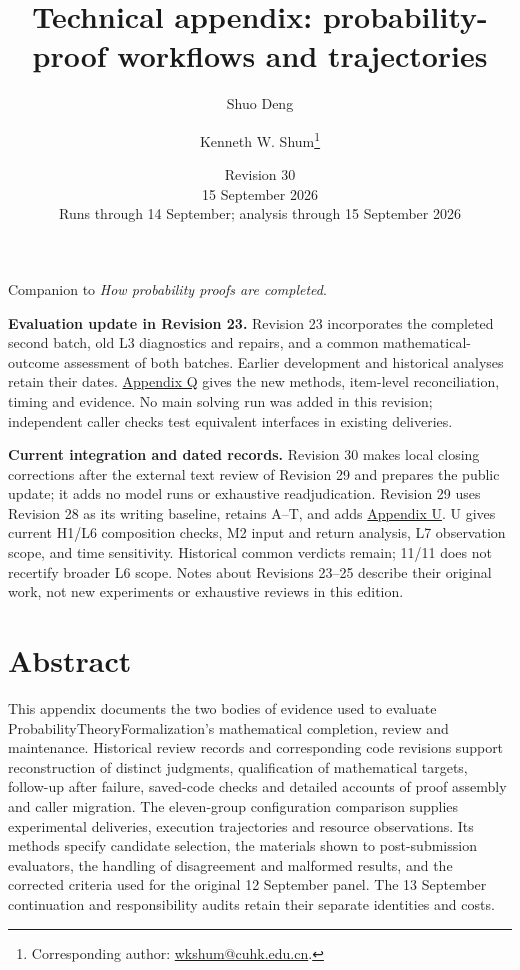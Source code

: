 
\title{Technical appendix: probability-proof workflows and trajectories}
\author{Shuo Deng \and Kenneth W. Shum\thanks{Corresponding author: \href{mailto:wkshum@cuhk.edu.cn}{wkshum@cuhk.edu.cn}.}}\date{Revision 30\\15 September 2026\\Runs through 14 September; analysis through 15 September 2026}
\maketitle
Companion to \emph{How probability proofs are completed}.

\textbf{Evaluation update in Revision 23.} Revision 23 incorporates the completed second batch, old L3 diagnostics and repairs, and a common mathematical-outcome assessment of both batches. Earlier development and historical analyses retain their dates. \hyperlink{appendix-q}{Appendix Q} gives the new methods, item-level reconciliation, timing and evidence. No main solving run was added in this revision; independent caller checks test equivalent interfaces in existing deliveries.

\textbf{Current integration and dated records.} Revision 30 makes local closing corrections after the external text review of Revision 29 and prepares the public update; it adds no model runs or exhaustive readjudication. Revision 29 uses Revision 28 as its writing baseline, retains A–T, and adds \hyperlink{appendix-u}{Appendix U}. U gives current H1/L6 composition checks, M2 input and return analysis, L7 observation scope, and time sensitivity. Historical common verdicts remain; 11/11 does not recertify broader L6 scope. Notes about Revisions 23–25 describe their original work, not new experiments or exhaustive reviews in this edition.

\section*{\texorpdfstring{\protect\hypertarget{abstract}{}Abstract}{Abstract}}
This appendix documents the two bodies of evidence used to evaluate ProbabilityTheoryFormalization's mathematical completion, review and maintenance. Historical review records and corresponding code revisions support reconstruction of distinct judgments, qualification of mathematical targets, follow-up after failure, saved-code checks and detailed accounts of proof assembly and caller migration. The eleven-group configuration comparison supplies experimental deliveries, execution trajectories and resource observations. Its methods specify candidate selection, the materials shown to post-submission evaluators, the handling of disagreement and malformed results, and the corrected criteria used for the original 12 September panel. The 13 September continuation and responsibility audits retain their separate identities and costs.

